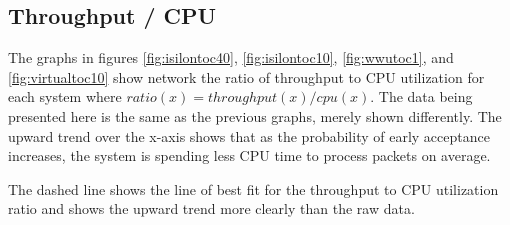 \documentclass[journal]{IEEEtran}
\begin{document}

  \subsection{Throughput / CPU}

    The graphs in figures \ref{fig:isilontoc40}, \ref{fig:isilontoc10}, \ref{fig:wwutoc1}, and \ref{fig:virtualtoc10}  show network the ratio of throughput to CPU utilization for
    each system where $ratio(x) = throughput(x) / cpu(x)$. The data being
    presented here is the same as the previous graphs, merely shown
    differently. The upward trend over the x-axis shows that as the probability
    of early acceptance increases, the system is spending less CPU time to
    process packets on average.

    The dashed line shows the line of best fit for the throughput to CPU
    utilization ratio and shows the upward trend more clearly than the raw
    data.
    
\end{document}
